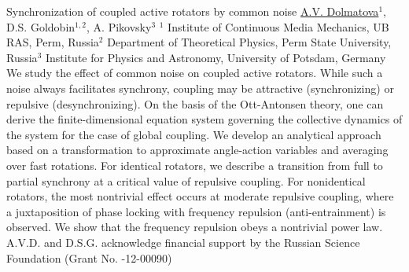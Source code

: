 
    \begin{abstract_online}{Synchronization of coupled active rotators by common noise}{%
        \underline{A.V. Dolmatova}$^{1}$, D.S. Goldobin$^{1,2}$, A. Pikovsky$^{3}$}{%
        }{%
        $^1$ Institute of Continuous Media Mechanics, UB RAS, Perm, Russia\newline{}$^2$ Department of Theoretical Physics, Perm State University, Russia\newline{}$^3$ Institute for Physics and Astronomy, University of Potsdam, Germany}
    We study the effect of common noise on coupled active rotators. While such a noise always  facilitates synchrony, coupling may be attractive (synchronizing) or repulsive (desynchronizing).  On the basis of the Ott-Antonsen theory, one can derive the finite-dimensional equation system  governing the collective dynamics of the system for the case of global coupling. We develop an  analytical approach based on a transformation to approximate angle-action variables and  averaging over fast rotations. For identical rotators, we describe a transition from full to partial synchrony at a critical value of repulsive coupling. For nonidentical rotators, the most nontrivial  effect occurs at moderate repulsive coupling, where a juxtaposition of phase locking with  frequency repulsion (anti-entrainment) is observed. We show that the frequency repulsion  obeys a nontrivial power law.  A.V.D. and D.S.G. acknowledge financial support by the Russian Science Foundation (Grant No.  -12-00090)  
    
    \end{abstract_online}
    